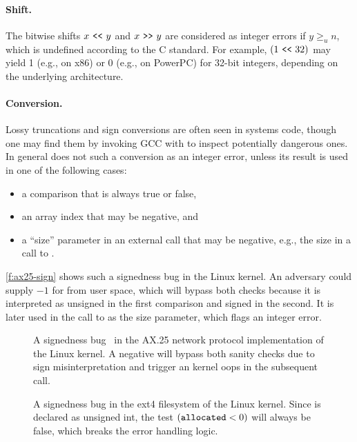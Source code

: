 \paragraph{Shift.}
The bitwise shifts $x \ \texttt{<}\texttt{<}\  y$ and $x \ \texttt{>}\texttt{>}\  y$ are considered as
integer errors if $y \geq_u n$, which is undefined according to the
C standard.  For example, $(1 \ \texttt{<}\texttt{<}\  32)$ may yield 1 (e.g., on x86)
or 0 (e.g., on PowerPC) for 32-bit integers, depending on the
underlying architecture.

\paragraph{Conversion.}
Lossy truncations and sign conversions are often seen in systems
code, though one may find them by invoking GCC with 
to inspect potentially dangerous ones.  In general \sys does not
such a conversion as an integer error, unless its result is used
in one of the following cases: \begin{itemize}
\item
a comparison that is always true or false,
\item
an array index that may be negative, and
\item
a ``size'' parameter in an external call that may be negative, e.g.,
the size in a call to .
\end{itemize}

\autoref{f:ax25-sign} shows such a signedness bug in the Linux
kernel.  An adversary could supply $-1$ for  from user
space, which will bypass both checks because it is interpreted as
unsigned in the first comparison and signed in the second.  It is
later used in the call to  as the size parameter,
which flags an integer error.


\begin{figure}
\centering

\vspace{-1em}
\caption{A signedness bug~\cite[CVE-2009-2909]{cve} in the AX.25
network protocol implementation of the Linux kernel.  A negative
 will bypass both sanity checks due to sign misinterpretation
 and trigger an kernel
oops in the subsequent  call.}
\label{f:ax25-sign}
\end{figure}
\begin{figure}
\centering

\vspace{-1em}
\caption{A signedness bug in the ext4 filesystem of the Linux kernel.
Since  is declared as unsigned int, the test
$(\texttt{allocated} < 0)$ will always be false, which breaks the
error handling logic.}
\label{f:ext4}
\end{figure}
\fi

